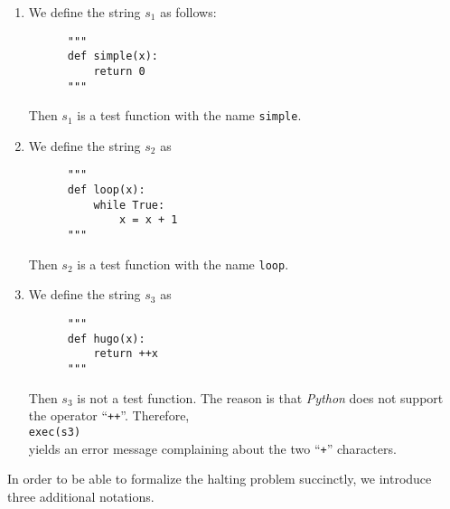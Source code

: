 \examplesEng
\begin{enumerate}
\item We define the string $s_1$ as follows:
      \begin{verbatim}
      """
      def simple(x): 
          return 0
      """
      \end{verbatim}
      \vspace*{-0.8cm}

      Then $s_1$ is a test function with the name \texttt{simple}.
\item We define the string $s_2$ as
      \begin{verbatim}
      """
      def loop(x): 
          while True: 
              x = x + 1
      """
      \end{verbatim}
      \vspace*{-0.8cm}

      Then $s_2$ is a test function with the name \texttt{loop}. 
\item We define the string $s_3$ as
      \begin{verbatim}
      """
      def hugo(x):
          return ++x
      """
      \end{verbatim}
      \vspace*{-0.8cm}

      Then $s_3$ is not a test function.  The reason is that \textsl{Python} does not support the operator
      ``\texttt{++}''.  Therefore, 
      \\[0.2cm]
      \hspace*{1.3cm}
      \texttt{exec(s3)}
      \\[0.2cm]
      yields an error message complaining about the two ``\texttt{+}'' characters.
\end{enumerate}
In order to be able to formalize the halting problem succinctly, we introduce three additional
notations.

